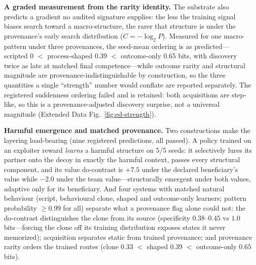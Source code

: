 \documentclass[11pt]{article}
\theoremstyle{definition}
\begin{document}
\textbf{A graded measurement from the rarity identity.}
The substrate also predicts a gradient no audited signature supplies:
the less the training signal biases search toward a macro-structure,
the rarer that structure is under the provenance's early search
distribution ($C=-\log_2 P$). Measured for one macro-pattern under
three provenances, the seed-mean ordering is as predicted---scripted
$0$ $<$ process-shaped $0.39$ $<$ outcome-only $0.65$ bits, with
discovery twice as late at matched final competence---while outcome
rarity and structural magnitude are provenance-indistinguishable by
construction, so the three quantities a single ``strength'' number
would conflate are reported separately. The registered suddenness
ordering failed and is retained: both acquisitions are step-like, so
this is a provenance-adjusted discovery surprise, not a universal
magnitude (Extended Data Fig.~\ref{fig:ed-strength}).

\textbf{Harmful emergence and matched provenance.}
Two constructions make the layering load-bearing (nine registered
predictions, all passed). A policy trained on an exploiter reward
\emph{learns} a harmful structure on 5/5 seeds: it selectively lures
its partner onto the decoy in exactly the harmful context, passes
every structural component, and its value do-contrast is $+7.5$ under
the declared beneficiary's value while $-2.0$ under the team
value---structurally emergent under both values, adaptive only for its
beneficiary. And four systems with matched natural behaviour (script,
behavioural clone, shaped and outcome-only learners; pattern
probability $\ge0.99$ for all) separate what a provenance flag alone
could not: the do-contrast distinguishes the clone from its source
(specificity $0.38$--$0.45$ vs $1.0$ bits---forcing the clone off its
training distribution exposes states it never memorized); acquisition
separates static from trained provenance; and provenance rarity orders
the trained routes (clone $0.33$ $<$ shaped $0.39$ $<$ outcome-only
$0.65$ bits).
\end{document}
